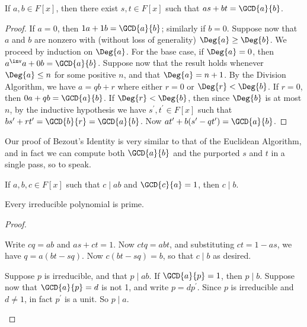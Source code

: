 \documentclass{memoir}
\begin{document}
\begin{prp}
If $a,b \in F[x]$, then there exist $s,t \in F[x]$ such that $as + bt = \GCD{a}{b}$.
\end{prp}

\begin{proof}
If $a = 0$, then $1a + 1b = \GCD{a}{b}$; similarly if $b = 0$. Suppose now that $a$ and $b$ are nonzero with (without loss of generality) $\Deg{a} \geq \Deg{b}$. We proceed by induction on $\Deg{a}$. For the base case, if $\Deg{a} = 0$, then $a^\inv a + 0b = \GCD{a}{b}$. Suppose now that the result holds whenever $\Deg{a} \leq n$ for some positive $n$, and that $\Deg{a} = n+1$. By the Division Algorithm, we have $a = qb + r$ where either $r = 0$ or $\Deg{r} < \Deg{b}$. If $r = 0$, then $0a + qb = \GCD{a}{b}$. If $\Deg{r} < \Deg{b}$, then since $\Deg{b}$ is at most $n$, by the inductive hypothesis we have $s^\prime, t^\prime \in F[x]$ such that $bs^\prime + rt^\prime = \GCD{b}{r} = \GCD{a}{b}$. Now $at^\prime + b(s^\prime - qt^\prime) = \GCD{a}{b}$.
\end{proof}

Our proof of Bezout's Identity is very similar to that of the Euclidean Algorithm, and in fact we can compute both $\GCD{a}{b}$ and the purported $s$ and $t$ in a single pass, so to speak.

\begin{prp} \mbox{}
\begin{enumerate*}
\item If $a,b,c \in F[x]$ such that $c \mid ab$ and $\GCD{c}{a} = 1$, then $c \mid b$.
\item Every irreducible polynomial is prime.
\end{enumerate*}
\end{prp}

\begin{proof} \mbox{}
\begin{enumerate*}
\item Write $cq = ab$ and $as+ct = 1$. Now $ctq = abt$, and substituting $ct = 1-as$, we have $q = a(bt-sq)$. Now $c(bt-sq) = b$, so that $c \mid b$ as desired.
\item Suppose $p$ is irreducible, and that $p \mid ab$. If $\GCD{a}{p} = 1$, then $p \mid b$. Suppose now that $\GCD{a}{p} = d$ is not 1, and write $p = dp^\prime$. Since $p$ is irreducible and $d \neq 1$, in fact $p^\prime$ is a unit. So $p \mid a$. \qedhere
\end{enumerate*}
\end{proof}
\end{document}
